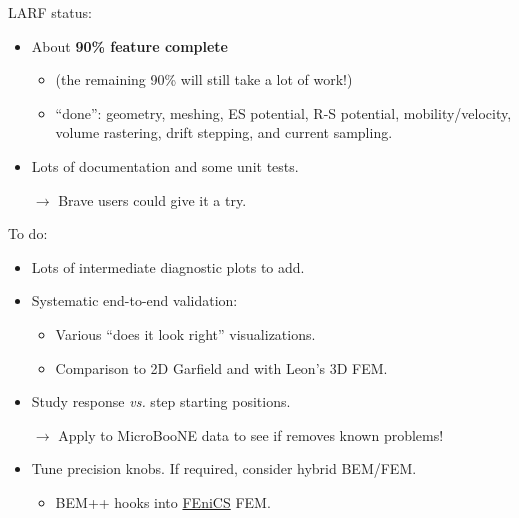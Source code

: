 \documentclass[xcolor=dvipsnames]{beamer}
\begin{document}
\begin{frame}

  LARF status:

  \begin{itemize}\footnotesize
  \item About \textbf{90\% feature complete}
    \begin{itemize}\scriptsize
    \item (the remaining 90\% will still take a lot of work!)
    \item ``done'': geometry, meshing, ES potential, R-S potential,
      mobility/velocity, volume rastering, drift stepping, and current
      sampling.
    \end{itemize}
  \item Lots of documentation and some unit tests.
  \item[$\rightarrow$] Brave users could give it a try.    
  \end{itemize}

  To do:

  \begin{itemize}\footnotesize
  \item Lots of intermediate diagnostic plots to add.
  \item Systematic end-to-end validation:
    \begin{itemize}\scriptsize
    \item Various ``does it look right'' visualizations.
    \item Comparison to 2D Garfield and with Leon's 3D FEM.
    \end{itemize}
  \item Study response \textit{vs.} step starting positions.
  \item[$\rightarrow$] Apply to MicroBooNE data to see if removes known problems!
  \item Tune precision knobs.  If required, consider hybrid BEM/FEM.
    \begin{itemize}\scriptsize
    \item BEM++ hooks into \href{https://fenicsproject.org/}{FEniCS} FEM.
    \end{itemize}
  \end{itemize}
\end{frame}
\end{document}
